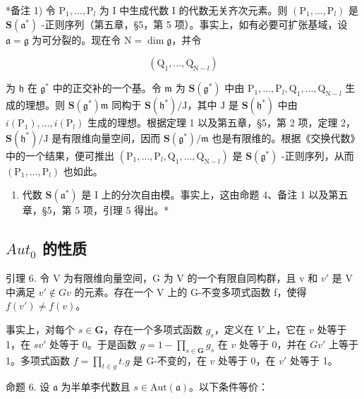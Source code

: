 *备注 1) 令 \(\mathrm{P}_1, \ldots, \mathrm{P}_l\) 为 I 中生成代数 I 的代数无关齐次元素。则 \((\mathrm{P}_1, \ldots, \mathrm{P}_l)\) 是 \(\mathbf{S}(\mathfrak{a}^*)\) -正则序列（第五章，§5，第 5 项）。事实上，如有必要可扩张基域，设 \(\mathfrak{a} = \mathfrak{g}\) 为可分裂的。现在令 \(\mathrm{N} = \dim \mathfrak{g}\)，并令

\[
\left(\mathrm{Q} _ {1}, \dots , \mathrm{Q} _ {\mathrm{N} - l}\right)
\]

为 \(\mathfrak{h}\) 在 \(\mathfrak{g}^*\) 中的正交补的一个基。令 \(\mathfrak{m}\) 为 \(\mathbf{S}(\mathfrak{g}^*)\) 中由 \(\mathrm{P}_1, \ldots, \mathrm{P}_l, \mathrm{Q}_1, \ldots, \mathrm{Q}_{\mathrm{N}-l}\) 生成的理想。则 \(\mathbf{S}(\mathfrak{g}^*)\mathfrak{m}\) 同构于 \(\mathbf{S}(\mathfrak{h}^*)/\mathrm{J}\)，其中 \(\mathrm{J}\) 是 \(\mathbf{S}(\mathfrak{h}^*)\) 中由 \(i(\mathrm{P}_1), \ldots, i(\mathrm{P}_l)\) 生成的理想。根据定理 1 以及第五章，§5，第 2 项，定理 2，\(\mathbf{S}(\mathfrak{h}^*)/\mathrm{J}\) 是有限维向量空间，因而 \(\mathbf{S}(\mathfrak{g}^*)/\mathfrak{m}\) 也是有限维的。根据《交换代数》中的一个结果，便可推出 \((\mathrm{P}_1, \ldots, \mathrm{P}_l, \mathrm{Q}_1, \ldots, \mathrm{Q}_{\mathrm{N}-l})\) 是 \(\mathbf{S}(\mathfrak{g}^*)\) -正则序列，从而 \((\mathrm{P}_1, \ldots, \mathrm{P}_l)\) 也如此。

\begin{enumerate}
\def\labelenumi{\arabic{enumi})}
\setcounter{enumi}{1}
\tightlist
\item
  代数 \(\mathbf{S}(\mathfrak{a}^*)\) 是 I 上的分次自由模。事实上，这由命题 4、备注 1 以及第五章，§5，第 5 项，引理 5 得出。*
\end{enumerate}

\subsection{\texorpdfstring{\(Aut_{0}\) 的性质}{Aut\_\{0\} 的性质}}

引理 6. 令 V 为有限维向量空间，G 为 V 的一个有限自同构群，且 v 和 \(v'\) 是 V 中满足 \(v' \notin Gv\) 的元素。存在一个 V 上的 G-不变多项式函数 f，使得 \(f(v') \neq f(v)\)。

事实上，对每个 \(s \in \mathbf{G}\)，存在一个多项式函数 \(g_{s}\)，定义在 \(V\) 上，它在 \(v\) 处等于 1，在 \(sv'\) 处等于 0。于是函数 \(g = 1 - \prod_{s \in \mathbf{G}} g_{s}\) 在 \(v\) 处等于 0，并在 \(Gv'\) 上等于 1。多项式函数 \(f = \prod_{t \in g} t.g\) 是 G-不变的，在 \(v\) 处等于 0，在 \(v'\) 处等于 1。

命题 6. 设 \(\mathfrak{a}\) 为半单李代数且 \(s\in \mathrm{Aut}(\mathfrak{a})\)。以下条件等价：

